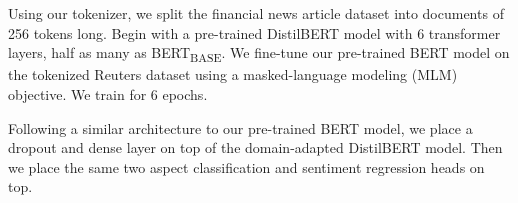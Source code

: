 
Using our tokenizer, we split the financial news article dataset into documents of 256 tokens long.
Begin with a pre-trained DistilBERT model \citep{DBLP:journals/corr/abs-1910-01108} with 6 transformer layers, half as many as BERT\textsubscript{BASE}.
We fine-tune our pre-trained BERT model on the tokenized Reuters dataset using a masked-language modeling (MLM) objective.
We train for 6 epochs.



Following a similar architecture to our pre-trained BERT model, we place a dropout and dense layer on top of the domain-adapted DistilBERT model.
Then we place the same two aspect classification and sentiment regression heads on top.